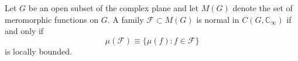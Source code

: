 Let $G$ be an open subset of the complex plane and let $M(G)$ denote the set of meromorphic functions on $G$. A family $\mathcal{F} \subset M(G)$ is normal in $C(G, \mathbb{C}_\infty)$ if and only if
$$\mu(\mathcal{F}) \equiv \{\mu(f): f \in \mathcal{F}\}$$
is locally bounded.
